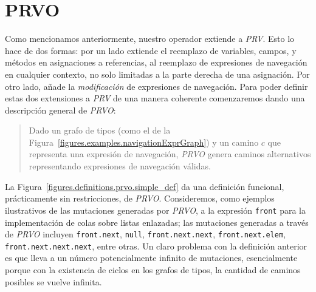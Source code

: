 \section{PRVO}
\label{sec:prvo.prvo}

Como mencionamos anteriormente, nuestro operador extiende a \emph{PRV}. Esto lo hace de dos formas: por un lado extiende el reemplazo de variables, campos, y m\'etodos en asignaciones a referencias, al reemplazo de expresiones de navegaci\'on en cualquier contexto, no solo limitadas a la parte derecha de una asignaci\'on. Por otro lado, a\~nade la \emph{modificaci\'on} de expresiones de navegaci\'on. Para poder definir estas dos extensiones a \emph{PRV} de una manera coherente comenzaremos dando una descripci\'on general de \emph{PRVO}:

\begin{quote}
	Dado un grafo de tipos (como el de la Figura~\ref{figures.examples.navigationExprGraph}) y un camino $c$ que representa una expresi\'on de navegaci\'on, \emph{PRVO} genera caminos alternativos representando expresiones de navegaci\'on v\'alidas.
\end{quote}
La Figura~\ref{figures.definitions.prvo.simple_def} da una definici\'on funcional, pr\'acticamente sin restricciones, de \emph{PRVO}. Consideremos, como ejemplos ilustrativos de las mutaciones generadas por \emph{PRVO}, a la expresi\'on \texttt{front} para la implementaci\'on de colas sobre listas enlazadas; las mutaciones generadas a trav\'es de \emph{PRVO} incluyen \texttt{front.next}, \texttt{null}, \texttt{front.next.next}, \texttt{front.next.elem}, \texttt{front.next.next.next}, entre otras. Un claro problema con la definici\'on anterior es que lleva a un n\'umero potencialmente infinito de mutaciones, esencialmente porque con la existencia de ciclos en los grafos de tipos, la cantidad de caminos posibles se vuelve infinita.

